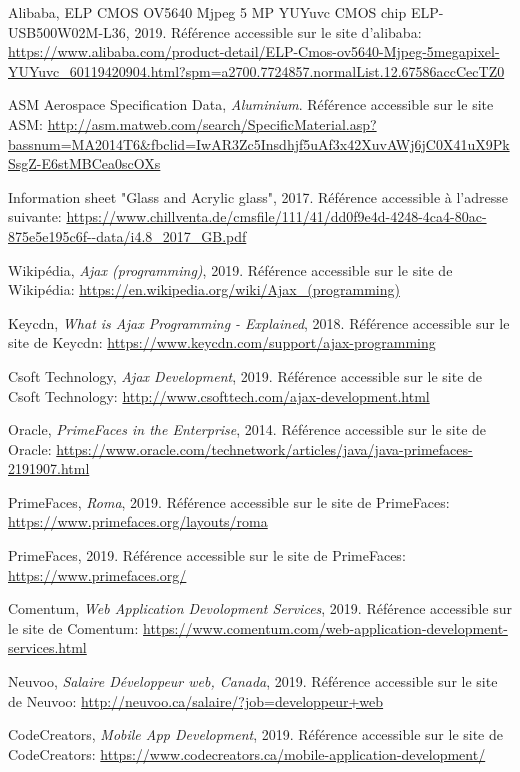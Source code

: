 \begin{thebibliographyUL}{9}
 Alibaba, ELP CMOS OV5640 Mjpeg 5 MP YUYuvc CMOS chip ELP-USB500W02M-L36, 2019. Référence accessible sur le site d'alibaba: \url{https://www.alibaba.com/product-detail/ELP-Cmos-ov5640-Mjpeg-5megapixel-YUYuvc_60119420904.html?spm=a2700.7724857.normalList.12.67586accCecTZ0}

 ASM Aerospace Specification Data, \emph{Aluminium}. Référence accessible sur le site ASM: \url{http://asm.matweb.com/search/SpecificMaterial.asp?bassnum=MA2014T6&fbclid=IwAR3Zc5Insdhjf5uAf3x42XuvAWj6jC0X41uX9PkSsgZ-E6stMBCea0scOXs}

 Information sheet "Glass and Acrylic glass", 2017. Référence accessible à l'adresse suivante: \url{https://www.chillventa.de/cmsfile/111/41/dd0f9e4d-4248-4ca4-80ac-875e5e195c6f--data/i4.8_2017_GB.pdf}

 Wikipédia, \emph{Ajax (programming)}, 2019. Référence accessible sur le site de Wikipédia: \url{https://en.wikipedia.org/wiki/Ajax_(programming)}

 Keycdn, \emph{What is Ajax Programming - Explained}, 2018. Référence accessible sur le site de Keycdn: \url{https://www.keycdn.com/support/ajax-programming}

 Csoft Technology, \emph{Ajax Development}, 2019. Référence accessible sur le site de Csoft Technology: \url{http://www.csofttech.com/ajax-development.html}

 Oracle, \emph{PrimeFaces in the Enterprise}, 2014. Référence accessible sur le site de Oracle: \url{https://www.oracle.com/technetwork/articles/java/java-primefaces-2191907.html}

 PrimeFaces, \emph{Roma}, 2019. Référence accessible sur le site de PrimeFaces: \url{https://www.primefaces.org/layouts/roma}

 PrimeFaces, 2019. Référence accessible sur le site de PrimeFaces: \url{https://www.primefaces.org/}

 Comentum, \emph{Web Application Devolopment Services}, 2019. Référence accessible sur le site de Comentum: \url{https://www.comentum.com/web-application-development-services.html}

 Neuvoo, \emph{Salaire Développeur web, Canada}, 2019. Référence accessible sur le site de Neuvoo: \url{http://neuvoo.ca/salaire/?job=developpeur+web}

 CodeCreators, \emph{Mobile App Development}, 2019. Référence accessible sur le site de CodeCreators: \url{https://www.codecreators.ca/mobile-application-development/}


\end{thebibliographyUL}
